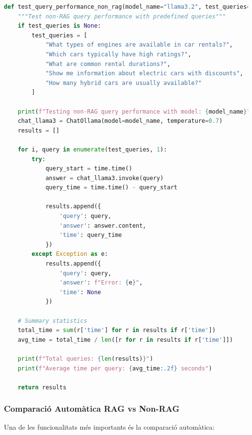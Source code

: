 \documentclass[12pt,a4paper]{article}
\begin{document}
\begin{lstlisting}[language=Python,caption=Proves de rendiment automatitzades Non-RAG]
def test_query_performance_non_rag(model_name="llama3.2", test_queries=None):
    """Test non-RAG query performance with predefined queries"""
    if test_queries is None:
        test_queries = [
            "What types of engines are available in car rentals?",
            "Which cars typically have high ratings?",
            "What are common rental durations?",
            "Show me information about electric cars with discounts",
            "How many hybrid cars are usually available?"
        ]
    
    print(f"Testing non-RAG query performance with model: {model_name}")
    chat_llama3 = ChatOllama(model=model_name, temperature=0.7)
    results = []
    
    for i, query in enumerate(test_queries, 1):
        try:
            query_start = time.time()
            answer = chat_llama3.invoke(query)
            query_time = time.time() - query_start
            
            results.append({
                'query': query,
                'answer': answer.content,
                'time': query_time
            })
        except Exception as e:
            results.append({
                'query': query,
                'answer': f"Error: {e}",
                'time': None
            })
    
    # Summary statistics
    total_time = sum(r['time'] for r in results if r['time'])
    avg_time = total_time / len([r for r in results if r['time']])
    
    print(f"Total queries: {len(results)}")
    print(f"Average time per query: {avg_time:.2f} seconds")
    
    return results
\end{lstlisting}

\newpage
\subsubsection{Comparació Automàtica RAG vs Non-RAG}

Una de les funcionalitats més importants és la comparació automàtica:
\end{document}
